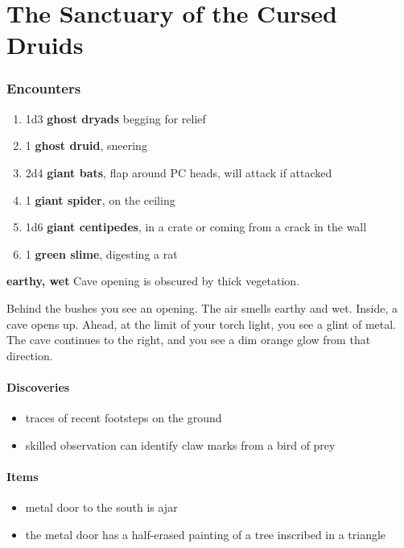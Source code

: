 \chapter*{The Sanctuary of the Cursed Druids}

\subsection{Encounters}
\begin{DndComment}
\begin{enumerate}
    \item 1d3 \textbf{ghost dryads} begging for relief
    \item 1 \textbf{ghost druid}, sneering
    \item 2d4 \textbf{giant bats}, flap around PC heads, will attack if attacked
    \item 1 \textbf{giant spider}, on the ceiling
    \item 1d6 \textbf{giant centipedes}, in a crate or coming from a crack in
    the wall
    \item 1 \textbf{green slime}, digesting a rat
\end{enumerate}
\end{DndComment}

\textbf{earthy, wet}
Cave opening is obscured by thick vegetation.
\begin{DndReadAloud}
    Behind the bushes you see an opening. The air smells earthy and wet. Inside,
    a cave opens up. Ahead, at the limit of your torch light, you see a glint of
    metal. The cave continues to the right, and you see a dim orange glow from
    that direction.
\end{DndReadAloud}
\subsubsection{Discoveries}
\begin{itemize}
    \item traces of recent footsteps on the ground
    \item skilled observation can identify claw marks from a bird of prey
\end{itemize}
\subsubsection{Items}
\begin{itemize}
\item metal door to the south is ajar
\item the metal door has a half-erased painting of a tree inscribed in a triangle
\end{itemize}

